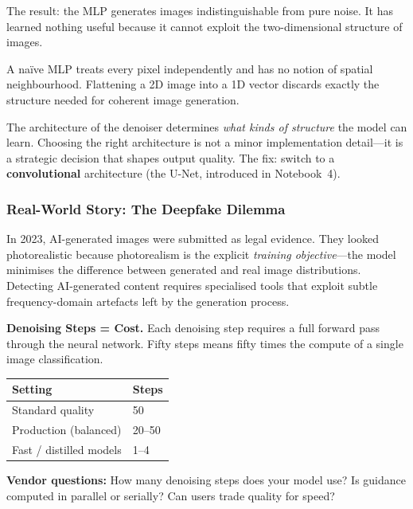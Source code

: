 \documentclass[11pt,a4paper]{article}
\begin{document}
The result: the MLP generates images indistinguishable from pure noise.
It has learned nothing useful because it cannot exploit the two-dimensional
structure of images.

\begin{pitfall}
A na\"ive MLP treats every pixel independently and has no notion of
spatial neighbourhood.  Flattening a 2D image into a 1D vector discards
exactly the structure needed for coherent image generation.
\end{pitfall}

\begin{keyinsight}
The architecture of the denoiser determines \emph{what kinds of
structure} the model can learn.  Choosing the right architecture is not a
minor implementation detail---it is a strategic decision that shapes
output quality.  The fix: switch to a \textbf{convolutional}
architecture (the U-Net, introduced in Notebook~4).
\end{keyinsight}

\subsubsection*{Real-World Story: The Deepfake Dilemma}

In 2023, AI-generated images were submitted as legal evidence.  They
looked photorealistic because photorealism is the explicit \emph{training
objective}---the model minimises the difference between generated and
real image distributions.  Detecting AI-generated content requires
specialised tools that exploit subtle frequency-domain artefacts left by
the generation process.

\begin{managerbox}
\textbf{Denoising Steps = Cost.}  Each denoising step requires a full
forward pass through the neural network.  Fifty steps means fifty times
the compute of a single image classification.

\begin{center}
\renewcommand{\arraystretch}{1.2}
\begin{tabular}{ll}
\toprule
Setting & Steps \\
\midrule
Standard quality & 50 \\
Production (balanced) & 20--50 \\
Fast / distilled models & 1--4 \\
\bottomrule
\end{tabular}
\end{center}

\textbf{Vendor questions:} How many denoising steps does your model use?
Is guidance computed in parallel or serially?  Can users trade quality
for speed?
\end{managerbox}
\end{document}
